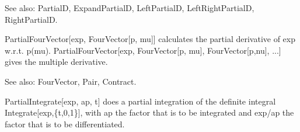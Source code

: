 See also:  PartialD, ExpandPartialD, LeftPartialD, LeftRightPartialD, RightPartialD.


\dispSFinmath{
\mu 
}






PartialFourVector[exp, FourVector[p, mu]] { }calculates the partial derivative of exp w.r.t. p(mu). PartialFourVector[exp, FourVector[p,
  mu], FourVector[p,nu], ...] { }gives the multiple derivative.

See also:  FourVector, Pair, Contract.






 PartialIntegrate[exp, ap, t] does a partial integration of the definite integral Integrate[exp,\{t,0,1\}], with ap the factor that is to
  be integrated and exp/ap the factor that is to be differentiated.











